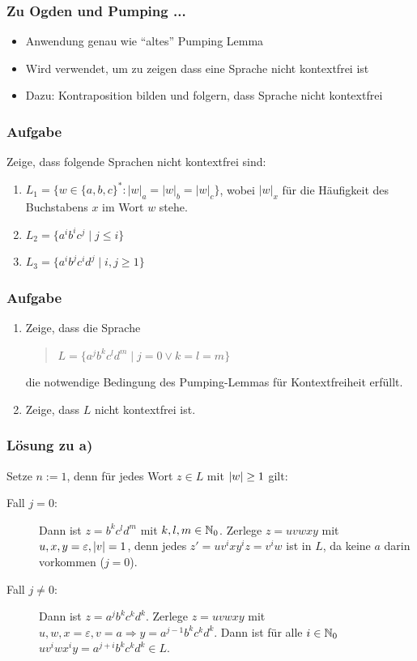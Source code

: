 \begin{frame}
\frametitle{Zu Ogden und Pumping ...}
\begin{itemize}
\item Anwendung genau wie "`altes"' Pumping Lemma
\item Wird verwendet, um zu zeigen dass eine Sprache nicht kontextfrei ist
\item Dazu: Kontraposition bilden und folgern, dass Sprache nicht kontextfrei
\end{itemize}
\end{frame}

\begin{frame}
\frametitle{Aufgabe}

Zeige, dass folgende Sprachen nicht kontextfrei sind:

\begin{enumerate}
  \item $L_1 = \{w \in \{a, b, c\}^*: |w|_a = |w|_b = |w|_c\}$,
	wobei $|w|_x$ für die Häufigkeit des
	Buchstabens $x$	im Wort $w$ stehe.
  \item $L_2 = \{a^ib^ic^j \mid j \leq i\}$
  \item $L_3=\{a^ib^jc^id^j \mid i,j \geq 1 \}$

\end{enumerate}
\end{frame}

\begin{frame}
\frametitle{Aufgabe}
\begin{enumerate}
  \item 
        Zeige, dass die Sprache
	\begin{quote}
	  $L = \{a^j b^k c^l d^m \mid j=0 \vee k=l=m\}$
	\end{quote}
	die notwendige Bedingung des Pumping-Lemmas für Kontextfreiheit
	erfüllt.
  \item Zeige, dass $L$ nicht kontextfrei ist.
\end{enumerate}
\end{frame}

\begin{frame}
\frametitle{Lösung zu a)}

Setze $n := 1$, denn für jedes Wort $z \in L$ mit $\left\vert w \right\vert \geq 1$ gilt:

\begin{description}
	\item[Fall $j = 0$:] Dann ist $z = b^kc^ld^m$ mit $k, l, m \in \mathbb{N}_0$. Zerlege $z = uvwxy$ mit $u, x, y = \varepsilon, \left\vert v \right\vert = 1$, denn jedes $z'=uv^ixy^iz = v^iw$ ist in $L$, da keine $a$ darin vorkommen ($j=0$).
	\item[Fall $j \neq 0$:] Dann ist $z=a^jb^kc^kd^k$. Zerlege $z = uvwxy$ mit $u,w, x = \varepsilon, v = a \Rightarrow y = a^{j-1}b^kc^kd^k$. Dann ist für alle $i \in \mathbb{N}_0$ $uv^iwx^iy = a^{j+i}b^kc^kd^k \in L$.
\end{description}

\end{frame}

